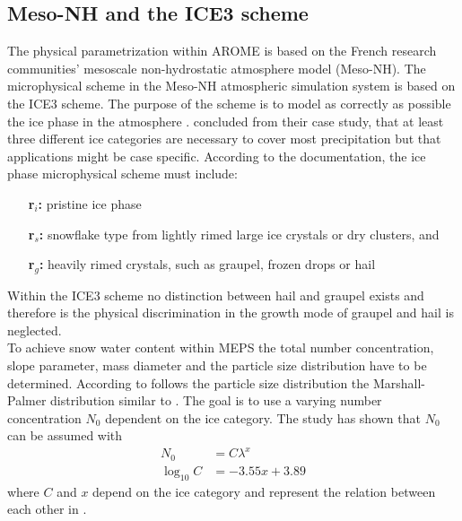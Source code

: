 \subsection{Meso-NH and the ICE3 scheme} \label{sec:MesoNH}
The physical parametrization within AROME is based on the French research communities' mesoscale non-hydrostatic atmosphere model (Meso-NH). The microphysical scheme in the Meso-NH atmospheric simulation system is based on the ICE3 scheme. The purpose of the scheme is to model as correctly as possible the ice phase in the atmosphere \citep{pinty_mixed-phased_1998}. \cite{mccumber_comparison_1991} concluded from their case study, that at least three different ice categories are necessary to cover most precipitation but that applications might be case specific. 
According to the \cite{meteo_france_meso-nh_2009} documentation, the ice phase microphysical scheme must include: 
\begin{itemize}
	\item [\textbf{r$_i$:}] pristine ice phase  
	\item [\textbf{r$_s$:}] snowflake type from lightly rimed large ice crystals or dry clusters, and
	\item [\textbf{r$_g$:}] heavily rimed crystals, such as graupel, frozen drops or hail
\end{itemize}
% 
Within the ICE3 scheme no distinction between hail and graupel exists and therefore is the physical discrimination in the growth mode of graupel and hail is neglected. \\
To achieve snow water content within MEPS the total number concentration, slope parameter, mass diameter and  the particle size distribution have to be determined. 
According to \cite{caniaux_numerical_1994} follows the particle size distribution the Marshall-Palmer distribution similar to . The goal is to use a varying number concentration $N_0$ dependent on the ice category. The study has shown that $N_0$ can be assumed with
\begin{align}
	N_0 & = C \lambda^x  \label{eq:model_N0}
	\\
	\log_{10}C & = -3.55x + 3.89  \nonumber
\end{align}
where $C$ and $x$ depend on the ice category and represent the relation between each other in . 
\\
